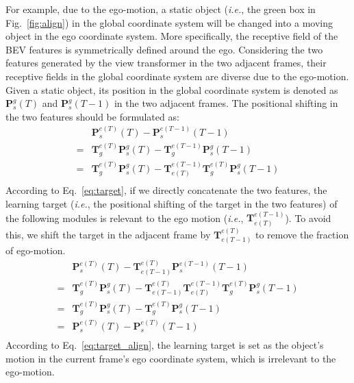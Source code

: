 \documentclass[10pt,twocolumn,letterpaper]{article}
\begin{document}
For example, due to the ego-motion, a static object (\textit{i.e.}, the green box in Fig.~\ref{fig:align}) in the global coordinate system will be changed into a moving object in the ego coordinate system. More specifically, the receptive field of the BEV features is symmetrically defined around the ego. Considering the two features generated by the view transformer in the two adjacent frames, their receptive fields in the global coordinate system are diverse due to the ego-motion. Given a static object, its position in the global coordinate system is denoted as $\textbf{P}^g_{s}(T)$ and $\textbf{P}^g_{s}(T-1)$ in the two adjacent frames. The positional shifting in the two features should be formulated as:
\begin{equation}
\label{eq:target}
    \begin{split}
          &\textbf{P}^{e(T)}_{s}(T)-\textbf{P}^{e(T-1)}_{s}(T-1) \\
        = &\textbf{T}^{e(T)}_g\textbf{P}^g_{s}(T)-\textbf{T}^{e(T-1)}_g\textbf{P}^g_{s}(T-1)\\
        = &\textbf{T}^{e(T)}_g\textbf{P}^g_{s}(T)-\textbf{T}^{e(T-1)}_{e(T)}\textbf{T}^{e(T)}_g\textbf{P}^g_{s}(T-1)\\
    \end{split}
\end{equation}
According to Eq.~\ref{eq:target}, if we directly concatenate the two features, the learning target (\textit{i.e.}, the positional shifting of the target in the two features) of the following modules is relevant to the ego motion (\textit{i.e.}, $\textbf{T}^{e(T-1)}_{e(T)}$). To avoid this, we shift the target in the adjacent frame by $\textbf{T}^{e(T)}_{e(T-1)}$ to remove the fraction of ego-motion.
\begin{equation}
\label{eq:target_align}
    \begin{split}
          &\textbf{P}^{e(T)}_{s}(T)-\textbf{T}^{e(T)}_{e(T-1)}\textbf{P}^{e(T-1)}_{s}(T-1) \\
        = &\textbf{T}^{e(T)}_g\textbf{P}^g_{s}(T)-\textbf{T}^{e(T)}_{e(T-1)}\textbf{T}^{e(T-1)}_{e(T)}\textbf{T}^{e(T)}_g\textbf{P}^g_{s}(T-1)\\
        = &\textbf{T}^{e(T)}_g\textbf{P}^g_{s}(T)-\textbf{T}^{e(T)}_g\textbf{P}^g_{s}(T-1)\\
        = &\textbf{P}^{e(T)}_{s}(T)-\textbf{P}^{e(T)}_{s}(T-1)\\
    \end{split}
\end{equation}
According to Eq.~\ref{eq:target_align}, the learning target is set as the object's motion in the current frame's ego coordinate system, which is irrelevant to the ego-motion.
\end{document}

